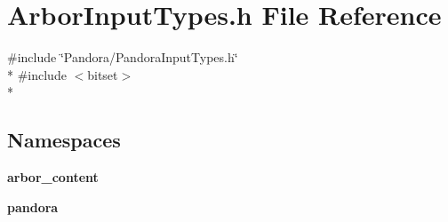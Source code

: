 \section{Arbor\+Input\+Types.\+h File Reference}
\label{ArborInputTypes_8h}
{\ttfamily \#include \char`\"{}Pandora/\+Pandora\+Input\+Types.\+h\char`\"{}}\\*
{\ttfamily \#include $<$bitset$>$}\\*
\subsection*{Namespaces}
\begin{DoxyCompactItemize}
\item 
 {\bf arbor\+\_\+content}
\item 
 {\bf pandora}
\end{DoxyCompactItemize}
